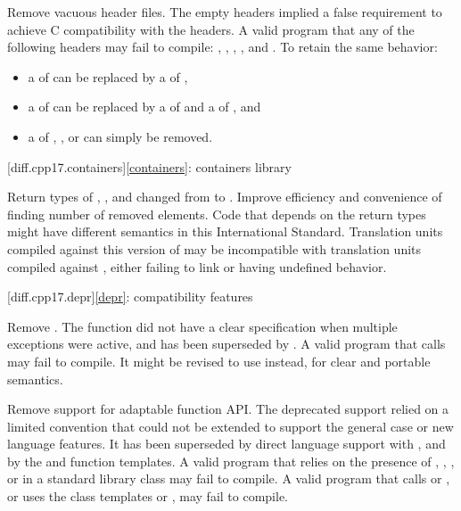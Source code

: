 \change Remove vacuous \Cpp{} header files.
\rationale
The empty headers implied a false requirement to achieve C compatibility with the \Cpp{} headers.
\effect
A valid \CppXVII{} program that  any of the following headers may fail to compile:
,
,
,
, and
.
To retain the same behavior:
\begin{itemize}
\item
a  of  can be replaced by
a  of ,
\item
a  of  can be replaced by
a  of  and
a  of ,
and
\item
a  of
,
, or
can simply be removed.
\end{itemize}

[diff.cpp17.containers]{\ref{containers}: containers library}

\change
Return types of , , and 
changed from  to .
\rationale Improve efficiency and convenience of finding number of removed elements.
\effect
Code that depends on the return types might have different semantics in this International Standard.
Translation units compiled against this version of \Cpp{} may be incompatible with
translation units compiled against \CppXVII{}, either failing to link or having undefined behavior.

[diff.cpp17.depr]{\ref{depr}: compatibility features}

\nodiffref
\change Remove .
\rationale
The function did not have a clear specification when multiple exceptions were
active, and has been superseded by .
\effect
A valid \CppXVII{} program that calls  may fail
to compile. It might be revised to use  instead,
for clear and portable semantics.

\nodiffref
\change Remove support for adaptable function API.
\rationale
The deprecated support relied on a limited convention that could not be
extended to support the general case or new language features. It has been
superseded by direct language support with , and by the
 and  function templates.
\effect
A valid \CppXVII{} program that relies on the presence of ,
, , or
 in a standard library class may fail to compile. A
valid \CppXVII{} program that calls  or , or uses the
class templates  or , may fail to
compile.

